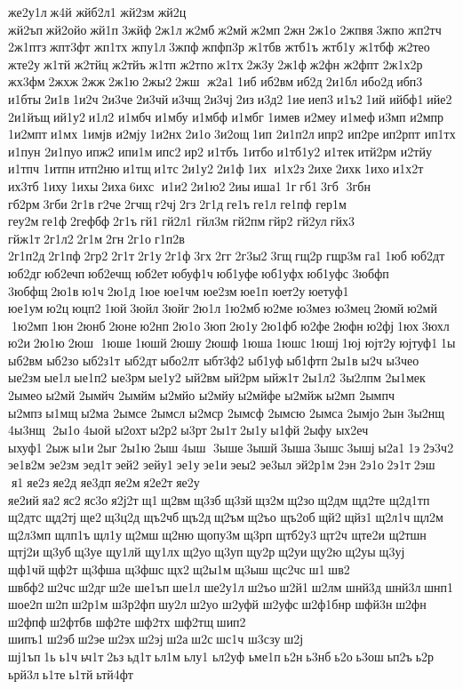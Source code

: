 же2у1л ж4й 
жйб2л1 	жй2зм жй2ц 	жй2ъп жй2ойо жй1п 3жйф 2ж1л ж2мб ж2мй ж2мп 2жн 2ж1о 	2жпвя 3жпо 	жп2тч 
2ж1птз жпт3фт 	жп1тх 	жпу1л 3жпф жпфп3р 	ж1тбв 	жтб1ъ 	жтб1у 	ж1тбф 	ж2тео 	жте2у ж1тй 	ж2тйц 	ж2тйъ ж1тп 	ж2тпо ж1тх 2ж3у 2ж1ф ж2фн 	ж2фпт 	2ж1х2р 	жх3фм 2жхж 2жж 2ж1ю 2жы2 2жш  ж2а1 1иб 	иб2вм иб2д 2и1бл 	ибо2д ибп3 	и1бты 2и1в 1и2ч 2и3че 2и3чй и3чщ 2и3чј 2из и3д2 1ие иеп3 и1ъ2 1ий 	ийбф1 ийе2 
2и1йъщ ий1у2 и1л2 	и1мбч 	и1мбу 	и1мбф 	и1мбг 	1имев 	и2меу 	и1меф и3мп  	и2мпр 
1и2мпт и1мх 	1имјв 	и2мју 1и2нх 2и1о 3и2ощ 1ип 	2и1п2л ипр2 	ип2ре ип2рпт 	ип1тх 	и1пун 
2и1пуо ипж2 	ипи1м ипс2 ир2 	и1тбъ 	1итбо и1тб1у2 	и1тек итй2рм 	и2тйу 	и1тпч 	1итпн итп2ню и1тщ и1тс 2и1у2 2и1ф 1их  и1х2з 2ихе 2ихк 1ихо и1х2т 	их3тб 1иху 1ихы 2иха 6ихс  и1и2 2и1ю2 2иы иша1 1г гб1 3гб  3гбн 	гб2рм 3гби 2г1в г2че 2гчщ г2чј 2гз 2г1д ге1ъ ге1л 	ге1пф 	гер1м 	геу2м ге1ф 2гефбф 2г1ъ гй1 гй2л1 	гйл3м 	гй2пм гйр2 	гй2ул гйх3 	гйж1т 2г1л2 2г1м 2гн 2г1о г1п2в 	2г1п2д 2г1пф 2гр2 2г1т 2г1у 2г1ф 3гх 2гг 2г3ы2 3гщ гщ2р 	гщр3м га1 1юб 	юб2дт 	юб2дг юб2ечп юб2ечщ 	юб2ет юбуф1ч юб1уфе юб1уфх юб1уфс 	3юбфп 	3юбфщ 2ю1в ю1ч 2ю1д 1юе 	юе1чм 	юе2зм юе1п 	юет2у юетуф1 	юе1ум ю2ц юцп2 1юй 3юйл 3юйг 2ю1л 1ю2мб ю2ме 	ю3мез 	ю3мец 2юмй ю2мй  1ю2мп 1юн 2юнб 2юне ю2нп 2ю1о 3юп 2ю1у 2ю1фб ю2фе 2юфн ю2фј 1юх 3юхл ю2и 2ю1ю 2юш  1юше 1юшй 2юшу 2юшф 1юша 1юшс 1юшј 1юј 	юјт2у юјтуф1 1ы 	ыб2вм 	ыб2зо 
ыб2з1т 	ыб2дт ыбо2лт 
ыбт3ф2 	ыб1уф ыб1фтп 2ы1в ы2ч 	ы3чео 	ые2зм ые1л ые1п2 	ые3рм ые1у2 	ый2вм 	ый2рм 	ыйж1т 2ы1л2 
3ы2лпм 
2ы1мек 	2ымео ы2мй  	2ымйч 	2ымйм 	ы2мйо 	ы2мйу ы2мйфе 	ы2мйж ы2мп  	2ымпч 	ы2мпз ы1мщ ы2ма 	2ымсе 	2ымсл 	ы2мср 	2ымсф 	2ымсю 	2ымса 	2ымјо 2ын 3ы2нщ 	4ы3нщ  2ы1о 4ыой 	ы2охт ы2р2 ы3рт 2ы1т 2ы1у ы1фй 2ыфу 	ых2еч 	ыхуф1 2ыж ы1и 2ыг 2ы1ю 2ыш 4ыш  3ыше 3ышй 3ыша 3ышс 3ышј ы2а1 1э 2э3ч2 
эе1в2м 	эе2зм 	эед1т эей2 	эейу1 эе1у эе1и эеы2 	эе3ыл 
эй2р1м 2эн 2э1о 2э1т 2эш  я1 яе2з яе2д 	яе3дп яе2м я2е2т яе2у 	яе2ий яа2 яс2 яс3о я2ј2т щ1 щ2вм щ3зб щ3зй щз2м щ2зо щ2дм 	щд2те 
щ2д1тп 	щ2дтс 	щд2тј ще2 щ3ц2д 	щъ2чб щъ2д щ2ъм щ2ъо 	щъ2об щй2 щйз1 щ2л1ч щл2м 
щ2л3мп 	щлп1ъ щл1у щ2мш щ2ню щопу3м щ3рп 
щтб2у3 щт2ч 	щте2и 	щ2тшн 	щтј2и щ3уб щ3уе 	щу1лй 	щу1лх щ2уо щ3уп щу2р щ2уи щу2ю щ2уы щ3уј 	щф1чй щф2т 	щ3фша 	щ3фшс щх2 щ2ы1м щ3ыш 	щс2чс ш1 шв2 	швбф2 ш2чс ш2дг ш2е 	ше1ъп ше1л 
ше2у1л ш2ъо ш2й1 ш2лм 	шнй3д 	шнй3л шнп1 	шое2п ш2п ш2р1м 
ш3р2фп шу2л ш2уо 	ш2уфй 	ш2уфс ш2ф1бнр 	шфй3н ш2фн 	ш2фпф ш2фтбв 	шф2те 	шф2тх 	шф2тщ шип2 	шипъ1 ш2эб ш2эе ш2эх ш2эј ш2а ш2с шс1ч 	ш3сзу ш2ј 	шј1ъп 1ь ь1ч ьч1т 2ьз ьд1т ьл1м ьлу1 	ьл2уф 	ьме1п ь2н ь3нб ь2о ь3ош ьп2ъ ь2р 	ьрй3л ь1те ь1тй ьтй4фт 
